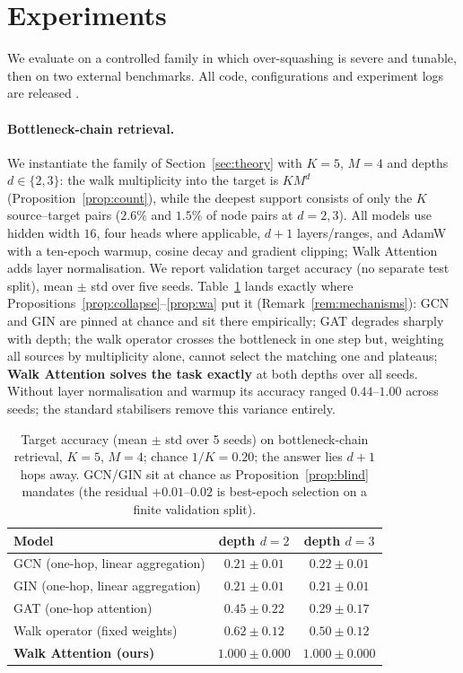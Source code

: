 \documentclass[runningheads]{llncs}
\begin{document}
\section{Experiments}\label{sec:exp}

We evaluate on a controlled family in which over-squashing is severe and
tunable, then on two external benchmarks. All code, configurations and
experiment logs are released \cite{repo_walkattention}.

\paragraph{Bottleneck-chain retrieval.}
We instantiate the family of Section~\ref{sec:theory} with $K{=}5$, $M{=}4$ and
depths $d\in\{2,3\}$: the walk multiplicity into the target is $KM^d$
(Proposition~\ref{prop:count}), while the deepest support consists of only the
$K$ source--target pairs ($2.6\%$ and $1.5\%$ of node pairs at $d{=}2,3$).
All models use hidden width $16$, four heads
where applicable, $d{+}1$ layers/ranges, and AdamW with a ten-epoch warmup,
cosine decay and gradient clipping; Walk Attention adds layer normalisation. We
report validation target accuracy (no separate test split), mean $\pm$ std
over five seeds. Table~\ref{tab:main} lands exactly
where Propositions~\ref{prop:collapse}--\ref{prop:wa} put it
(Remark~\ref{rem:mechanisms}): GCN and GIN are pinned at chance and sit there
empirically; GAT degrades sharply with depth; the walk operator crosses the
bottleneck in one step but, weighting all sources by multiplicity alone,
cannot select the matching one and plateaus; \textbf{Walk Attention solves the
task exactly} at both depths over all seeds. Without layer normalisation and
warmup its accuracy ranged $0.44$--$1.00$ across seeds; the standard
stabilisers remove this variance entirely.

\begin{table}[t]
\centering
\caption{Target accuracy (mean $\pm$ std over 5 seeds) on bottleneck-chain
retrieval, $K{=}5$, $M{=}4$; chance $1/K=0.20$; the answer lies $d{+}1$ hops
away. GCN/GIN sit at chance as Proposition~\ref{prop:blind} mandates (the
residual $+0.01$--$0.02$ is best-epoch selection on a finite validation
split).}
\label{tab:main}
\begin{tabular}{lcc}
\toprule
\textbf{Model} & \textbf{depth $d=2$} & \textbf{depth $d=3$} \\
\midrule
GCN (one-hop, linear aggregation)  & $0.21\pm0.01$ & $0.22\pm0.01$ \\
GIN (one-hop, linear aggregation)  & $0.21\pm0.01$ & $0.21\pm0.01$ \\
GAT (one-hop attention)            & $0.45\pm0.22$ & $0.29\pm0.17$ \\
Walk operator (fixed weights)      & $0.62\pm0.12$ & $0.50\pm0.12$ \\
\textbf{Walk Attention (ours)}     & $\mathbf{1.000\pm0.000}$ & $\mathbf{1.000\pm0.000}$ \\
\bottomrule
\end{tabular}
\end{table}
\end{document}
